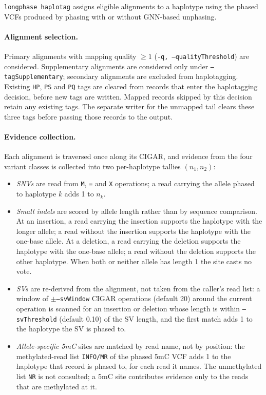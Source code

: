 \documentclass[11pt,a4paper]{article}
\newcommand{\code}[1]{\texttt{\small #1}}
\begin{document}
\code{longphase haplotag} assigns eligible alignments to a haplotype using the phased VCFs produced by phasing with or without GNN-based unphasing.

\paragraph{Alignment selection.} Primary alignments with mapping quality $\ge 1$ (\code{-q, --qualityThreshold}) are considered. Supplementary alignments are considered only under \code{--tagSupplementary}; secondary alignments are excluded from haplotagging. Existing \code{HP}, \code{PS} and \code{PQ} tags are cleared from records that enter the haplotagging decision, before new tags are written. Mapped records skipped by this decision retain any existing tags. The separate writer for the unmapped tail clears these three tags before passing those records to the output.

\paragraph{Evidence collection.} Each alignment is traversed once along its CIGAR, and evidence from the four variant classes is collected into two per-haplotype tallies $(n_1, n_2)$:
\begin{itemize}\itemsep2pt
\item \emph{SNVs} are read from \code{M}, \code{=} and \code{X} operations; a read carrying the allele phased to haplotype $k$ adds 1 to $n_k$.
\item \emph{Small indels} are scored by allele length rather than by sequence comparison. At an insertion, a read carrying the insertion supports the haplotype with the longer allele; a read without the insertion supports the haplotype with the one-base allele. At a deletion, a read carrying the deletion supports the haplotype with the one-base allele; a read without the deletion supports the other haplotype. When both or neither allele has length 1 the site casts no vote.
\item \emph{SVs} are re-derived from the alignment, not taken from the caller's read list: a window of $\pm$\code{--svWindow} CIGAR operations (default 20) around the current operation is scanned for an insertion or deletion whose length is within \code{--svThreshold} (default 0.10) of the SV length, and the first match adds 1 to the haplotype the SV is phased to.
\item \emph{Allele-specific 5mC} sites are matched by read name, not by position: the methylated-read list \code{INFO/MR} of the phased 5mC VCF adds 1 to the haplotype that record is phased to, for each read it names. The unmethylated list \code{NR} is not consulted; a 5mC site contributes evidence only to the reads that are methylated at it.
\end{itemize}
\end{document}
